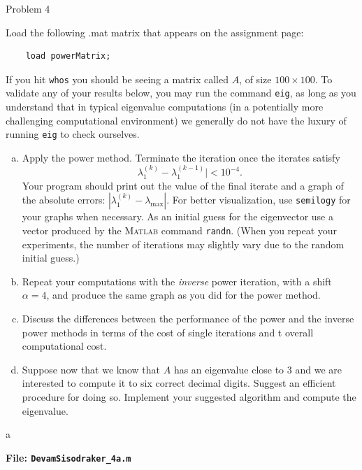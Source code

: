\begin{section}{Problem 4}
    \begin{problem}{4}
        Load the following .mat matrix that appears on the assignment page:
        \begin{verbatim}
    load powerMatrix;
        \end{verbatim}
        If you hit {\tt whos} you should be seeing a matrix called $A$, of size $100 \times 100$. To validate any of your results below, you may run the {} command {\tt eig}, as long as you understand that in typical eigenvalue computations (in a potentially more challenging computational environment) we generally do not have the luxury of running  {\tt eig} to check ourselves. 
        \begin{enumerate}[(a)]
            \item Apply the power method. Terminate the iteration once the iterates satisfy $$ \lambda_1^{(k)}-\lambda_1^{(k-1)}| < 10^{-4}.$$ Your program should print out the value of the final iterate and a graph of the absolute errors: $| \lambda_1^{(k)}-\lambda_{\max}|$. For better visualization, use {\tt semilogy}  for your graphs when necessary. As an initial guess for the eigenvector use a vector produced by the \textsc{Matlab} command {\tt randn}. (When you repeat your experiments, the number of iterations may slightly vary due to the random initial guess.)
            \item Repeat your computations with the {\em inverse} power iteration, with a shift $\alpha=4$, and produce the same graph as you did for the power method.
            \item Discuss the differences between the performance of the power and the inverse power methods in terms of the cost of single iterations and t overall computational cost.
            \item Suppose now that we know that $A$ has an eigenvalue close to 3 and we are interested to compute it to six correct decimal digits. Suggest an efficient procedure for doing so. Implement your suggested algorithm and compute the eigenvalue.
        \end{enumerate}
    \end{problem}

    \newpage

    \begin{solution}{a}
        \begin{mdframed}
            \footnotesize
            \textbf{File: {\tt DevamSisodraker\_4a.m}}
            \inputminted{matlab}{DevamSisodraker_4a.m}
            \normalfont
        \end{mdframed}
        

\end{solution}
\end{section}
